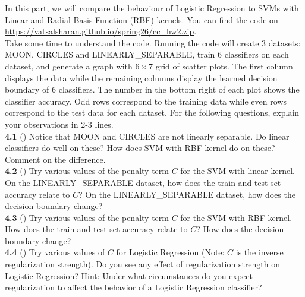 In this part, we will compare the behaviour of Logistic Regression to SVMs with Linear and Radial Basis Function (RBF) kernels. You can find the code on \url{https://vatsalsharan.github.io/spring26/cc_hw2.zip}.\\

Take some time to understand the code. Running the code will create 3 datasets: MOON, CIRCLES and LINEARLY\_SEPARABLE, train 6 classifiers on each dataset, and generate a graph with $6 \times 7$ grid of scatter plots. The first column displays the data while the remaining columns display the learned decision boundary of 6 classifiers. The number in the bottom right of each plot shows the classifier accuracy. Odd rows correspond to the training data while even rows correspond to the test data for each dataset. For the following questions, explain your observations in 2-3 lines.\\

\textbf{4.1} () Notice that MOON and CIRCLES are not linearly separable. Do linear classifiers do well on these? How does SVM with RBF kernel do on these? Comment on the difference.\\

\textbf{4.2} () Try various values of the penalty term $C$ for the SVM with linear kernel. On the LINEARLY\_SEPARABLE dataset, how does the train and test set accuracy relate to $C$? On the LINEARLY\_SEPARABLE dataset, how does the decision boundary change?\\

\textbf{4.3} () Try various values of the penalty term $C$ for the SVM with RBF kernel. How does the train and test set accuracy relate to $C$? How does the decision boundary change?\\

\textbf{4.4} () Try various values of $C$ for Logistic Regression (Note: $C$ is the inverse regularization strength). Do you see any effect of regularization strength on Logistic Regression? Hint: Under what circumstances do you expect regularization to affect the behavior of a Logistic Regression classifier?\\

